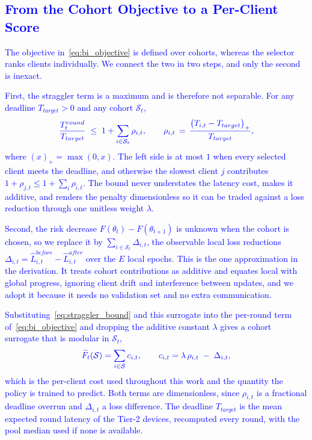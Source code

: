 \documentclass[journal]{IEEEtran}
\theoremstyle{remark}
\newcommand{\revtwo}[1]{\textcolor{blue}{#1}}
\newcommand{\revtwoeq}{\color{blue}}
\begin{document}
\subsection{\revtwo{From the Cohort Objective to a Per-Client Score}}
\revtwo{The objective in~\eqref{eq:bi_objective} is defined over cohorts, whereas the selector ranks clients individually. We connect the two in two steps, and only the second is inexact.}

\revtwo{First, the straggler term is a maximum and is therefore not separable. For any deadline $T_{target}>0$ and any cohort $\mathcal{S}_t$,}
\begin{equation}
	\revtwoeq \frac{T_t^{round}}{T_{target}}\;\le\;1+\sum_{i\in\mathcal{S}_t}\rho_{i,t},\qquad
	\rho_{i,t}\,=\,\frac{\bigl(T_{i,t}-T_{target}\bigr)_{+}}{T_{target}},
	\label{eq:straggler_bound}
\end{equation}
\revtwo{where $(x)_+=\max(0,x)$. The left side is at most $1$ when every selected client meets the deadline, and otherwise the slowest client $j$ contributes $1+\rho_{j,t}\le 1+\sum_i\rho_{i,t}$. The bound never understates the latency cost, makes it additive, and renders the penalty dimensionless so it can be traded against a loss reduction through one unitless weight $\lambda$.}

\revtwo{Second, the risk decrease $F(\theta_t)-F(\theta_{t+1})$ is unknown when the cohort is chosen, so we replace it by $\sum_{i\in\mathcal{S}_t}\Delta_{i,t}$, the observable local loss reductions $\Delta_{i,t}=\hat{L}^{before}_{i,t}-\hat{L}^{after}_{i,t}$ over the $E$ local epochs. This is the one approximation in the derivation. It treats cohort contributions as additive and equates local with global progress, ignoring client drift and interference between updates, and we adopt it because it needs no validation set and no extra communication.}

\revtwo{Substituting~\eqref{eq:straggler_bound} and this surrogate into the per-round term of~\eqref{eq:bi_objective} and dropping the additive constant $\lambda$ gives a cohort surrogate that is modular in $\mathcal{S}_t$,}
\begin{equation}
	\revtwoeq \widetilde{F}_t(\mathcal{S})=\sum_{i\in\mathcal{S}}c_{i,t},\qquad
	c_{i,t}=\lambda\,\rho_{i,t}\;-\;\Delta_{i,t} ,
	\label{eq:cost}
\end{equation}
\revtwo{which is the per-client cost used throughout this work and the quantity the policy is trained to predict. Both terms are dimensionless, since $\rho_{i,t}$ is a fractional deadline overrun and $\Delta_{i,t}$ a loss difference. The deadline $T_{target}$ is the mean expected round latency of the Tier-2 devices, recomputed every round, with the pool median used if none is available.}
\end{document}
